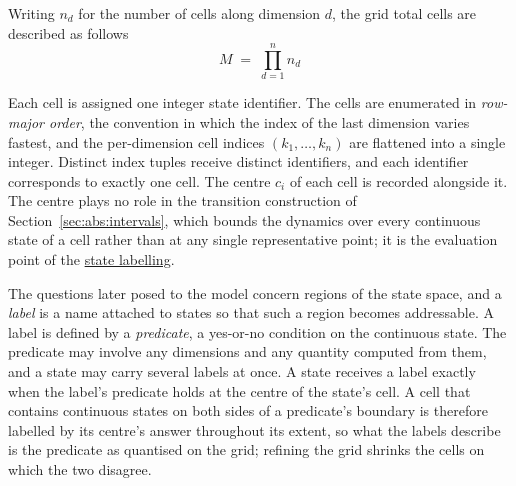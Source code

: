 \documentclass[11pt,a4paper]{article}
\theoremstyle{plain}
\theoremstyle{remark}
\begin{document}
	
	
	Writing $n_d$ for the number of cells along dimension $d$, the grid total cells are described as follows 
	\begin{equation}
		M \;=\; \prod_{d=1}^{n} n_d
		\label{eq:Mcount}
	\end{equation}
	
	
	Each cell is assigned one integer state identifier. The cells are
	enumerated in \emph{row-major order}, the convention in which the
	index of the last dimension varies fastest, and the per-dimension
	cell indices $(k_1, \dots, k_n)$ are flattened into a single integer.
	Distinct index tuples receive distinct identifiers, and each
	identifier corresponds to exactly one cell. The centre $c_i$ of each
	cell is recorded alongside it. The centre plays no role in the
	transition construction of Section~\ref{sec:abs:intervals}, which
	bounds the dynamics over every continuous state of a cell rather than
	at any single representative point; it is the evaluation point of the
	\hyperref[par:labelling]{state labelling}.\newline
	
	\label{par:labelling}%
	The questions later posed to the model concern regions of the
	state space, and a \emph{label} is a name attached to states so
	that such a region becomes addressable. A label is defined by a
	\emph{predicate}, a yes-or-no condition on the continuous state.
	The predicate may involve any dimensions and any quantity computed
	from them, and a state may carry several labels at once. A state
	receives a label exactly when the label's predicate holds at the
	centre of the state's cell. A cell that contains continuous states
	on both sides of a predicate's boundary is therefore labelled by
	its centre's answer throughout its extent, so what the labels
	describe is the predicate as quantised on the grid; refining the
	grid shrinks the cells on which the two disagree.\newline
	
\end{document}
